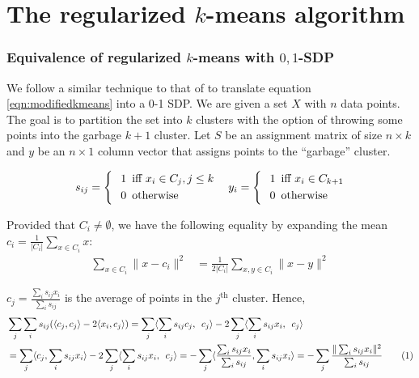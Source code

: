 \documentclass[12pt]{article}
\newcommand\numberthis{\addtocounter{equation}{1}\tag{\theequation}}
\begin{document}
\section{The regularized $k$-means algorithm}
\label{a-section:heuristic}
 
\subsubsection{Equivalence of regularized $k$-means with $0,1$-SDP}
\label{a-subsection:modifiedkmeans01sdp}
We follow a similar technique to that of \cite{peng2007approximating} to translate equation \ref{eqn:modifiedkmeans} into a 0-1 SDP. We are given a set $X$ with $n$ data points. The goal is to partition the set into $k$ clusters with the option of throwing some points into the garbage $k+1$ cluster. Let $S$ be an assignment matrix of size $n\times k$ and $y$ be an $n \times 1$ column vector that assigns points to the ``garbage'' cluster.  

 \[s_{ij} = 
    \begin{dcases}
		\hspace{0.1in} 1 \enspace \text{iff }x_i \in C_j, j \leq k\\
		\hspace{0.1in} 0 \enspace \text{otherwise}
	\end{dcases}
 \quad y_{i} = 
    \begin{dcases}
		\hspace{0.1in} 1 \enspace \text{iff }x_i \in C_{k+1}\\
		\hspace{0.1in} 0 \enspace \text{otherwise}
	\end{dcases}
\]

Provided that $C_i\ne\emptyset$, we have the following equality by expanding the mean $c_i = \frac{1}{|C_i|} \sum_{x\in C_i} x$:
\begin{align}
\label{a-eqn:kmeansobj1}
\sum_{x \in C_i} \|x-c_i\|^2 
&= \frac{1}{2|C_i|}\sum_{x, y \in C_i} \|x-y\|^2 
\end{align}

\noindent $c_j = \frac{\sum_{i} s_{ij} x_i}{\sum_{i} s_{ij}}$ is the average of points in the $j^{\text{th}}$ cluster. Hence,
\begin{align*}
	&\sum_j \sum_i s_{ij}(\langle c_j, c_j\rangle -2\langle x_i, c_j\rangle) = 	 \sum_j \langle\sum_i s_{ij} c_j, \enspace c_j\rangle - 2 \sum_j \langle\sum_i s_{ij} x_i, \enspace c_j\rangle \\
	&=\sum_j \langle c_j, \sum_i s_{ij}x_i\rangle - 2 \sum_j \langle\sum_i s_{ij} x_i, \enspace c_j\rangle = -\sum_j \langle\frac{\sum_i s_{ij} x_i}{\sum_i s_{ij}}, \sum_i s_{ij}x_i\rangle = -\sum_j \frac{\| \sum_i s_{ij} x_i\|^2}{\sum_i s_{ij}} \numberthis \label{a-eqn:kmeansobj2}
\end{align*}
\end{document}
